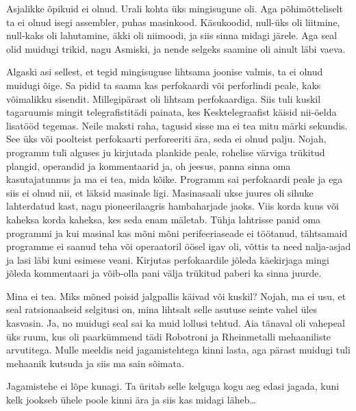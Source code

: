 
Asjalikke õpikuid ei olnud. Urali kohta üks mingisugune oli. Aga 
põhimõtteliselt ta ei olnud isegi assembler, puhas masinkood. Käsukoodid, 
null-üks oli liitmine, null-kaks oli lahutamine, äkki oli niimoodi, ja siis 
sinna midagi järele. Aga seal olid muidugi trikid,  nagu Asmiski, ja nende 
selgeks saamine oli ainult läbi vaeva. 

Algaski asi sellest, et tegid mingisuguse lihtsama joonise valmis,  ta ei olnud 
muidugi õige. Sa pidid ta saama kas perfokaardi või perforlindi peale, kaks 
võimalikku sisendit. Millegipärast oli lihtsam perfokaardiga. Siis tuli kuskil 
tagaruumis mingit telegrafistitädi painata, kes Kesktelegraafist käisid 
nii-öelda lisatööd tegemas. Neile maksti raha, tagusid sisse ma ei tea mitu  
märki sekundis. See üks või poolteist perfokaarti perforeeriti ära, seda ei 
olnud palju. Nojah, programm tuli alguses ju kirjutada  plankide peale, 
rohelise värviga trükitud plangid, operandid ja kommentaarid ja, oh jeesus,  
panna sinna oma kasutajatunnus ja ma ei tea, mida kõike. Programm sai 
perfokaardi peale ja ega siis ei olnud nii, et läksid masinale ligi. 
Masinasaali ukse juures oli sihuke lahterdatud kast, nagu pioneerilaagris 
hambaharjade jaoks. Viis korda kuus või kaheksa korda kaheksa, kes seda enam 
mäletab. Tühja lahtrisse panid oma programmi ja kui masinal kas mõni mõni 
perifeeriaseade ei töötanud, tähtsamaid programme ei saanud teha või 
operaatoril öösel igav oli, võttis ta need nalja-asjad ja lasi läbi kuni 
esimese veani. Kirjutas perfokaardile jõleda käekirjaga mingi jõleda 
kommentaari ja võib-olla pani välja trükitud paberi ka sinna juurde. 


Mina ei tea. Miks mõned poisid jalgpallis käivad või kuskil? Nojah, ma ei usu, 
et seal ratsionaalseid selgitusi on, mina lihtsalt selle  asutuse seinte vahel 
üles kasvasin. Ja, no muidugi seal sai ka muid lollusi tehtud. Aia tänaval oli 
vahepeal üks ruum, kus oli paarkümmend tädi Robotroni ja  Rheinmetalli  
mehaaniliste arvutitega. Mulle meeldis neid jagamistehtega kinni lasta, aga 
pärast muidugi tuli mehaanik kutsuda ja siis ma sain sõimata. 


Jagamistehe ei lõpe kunagi. Ta üritab selle kelguga kogu aeg edasi jagada, kuni 
kelk jookseb ühele poole kinni ära ja siis kas midagi läheb\ldots

